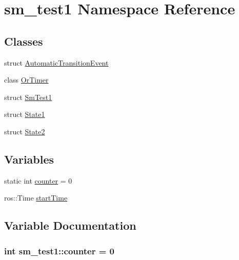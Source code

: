 \hypertarget{namespacesm__test1}{}\section{sm\+\_\+test1 Namespace Reference}
\label{namespacesm__test1}
\subsection*{Classes}
\begin{DoxyCompactItemize}
\item 
struct \hyperlink{structsm__test1_1_1AutomaticTransitionEvent}{Automatic\+Transition\+Event}
\item 
class \hyperlink{classsm__test1_1_1OrTimer}{Or\+Timer}
\item 
struct \hyperlink{structsm__test1_1_1SmTest1}{Sm\+Test1}
\item 
struct \hyperlink{structsm__test1_1_1State1}{State1}
\item 
struct \hyperlink{structsm__test1_1_1State2}{State2}
\end{DoxyCompactItemize}
\subsection*{Variables}
\begin{DoxyCompactItemize}
\item 
static int \hyperlink{namespacesm__test1_a807de4a3a915676ba97cad1d6e0f1318}{counter} = 0
\item 
ros\+::\+Time \hyperlink{namespacesm__test1_abb9998c780883187824713b717353f85}{start\+Time}
\end{DoxyCompactItemize}


\subsection{Variable Documentation}
\subsubsection[{\texorpdfstring{counter}{counter}}]{\setlength{\rightskip}{0pt plus 5cm}int sm\+\_\+test1\+::counter = 0\hspace{0.3cm}{\ttfamily [static]}}\hypertarget{namespacesm__test1_a807de4a3a915676ba97cad1d6e0f1318}{}\label{namespacesm__test1_a807de4a3a915676ba97cad1d6e0f1318}


